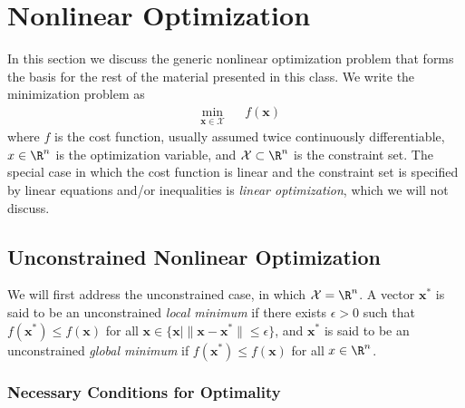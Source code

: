 \chapter{Nonlinear Optimization}

In this section we discuss the generic nonlinear optimization problem that forms the basis for the rest of the material presented in this class. We write the minimization problem as 
\begin{equation*}
\begin{aligned}
& \underset{\bm{x} \in \mathcal{X}}{\min}
& & f(\bm{x})
\end{aligned}
\end{equation*}
where $f$ is the cost function, usually assumed twice continuously differentiable, $x \in \R^n$ is the optimization variable, and $\mathcal{X} \subset \R^n$ is the constraint set. The special case in which the cost function is linear and the constraint set is specified by linear equations and/or inequalities is \textit{linear optimization}, which we will not discuss. 

\section{Unconstrained Nonlinear Optimization}

We will first address the unconstrained case, in which $\mathcal{X} = \R^n$. A vector $\bm{x}^*$ is said to be an unconstrained \textit{local minimum} if there exists $\epsilon > 0$ such that $f(\bm{x}^*) \leq f(\bm{x})$ for all $\bm{x} \in \{\bm{x} \mid \|\bm{x} - \bm{x}^*\| \leq \epsilon\}$, and $\bm{x}^*$ is said to be an unconstrained \textit{global minimum} if $f(\bm{x}^*) \leq f(\bm{x})$ for all $x \in \R^n$. 

\subsection{Necessary Conditions for Optimality}

